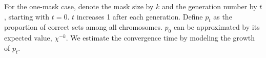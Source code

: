 \documentclass{sig-alternate}
\begin{document}
For the one-mask case,
denote the mask size by $k$ and the generation number by $t$, starting with $t=0$.
$t$ increases 1 after each generation.
Define $p_t$ as the proportion of correct sets among all chromosomes.
$p_0$ can be approximated by its expected value, $\chi^{-k}$.
We estimate the convergence time by modeling the growth of $p_t$.
\end{document}
